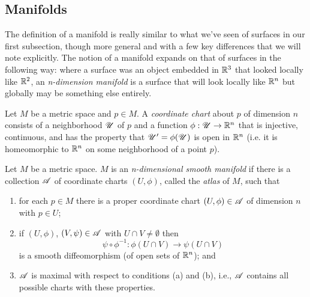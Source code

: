 \subsection{Manifolds}
  The definition of a manifold is really similar to what we've seen of surfaces in our first subsection, though more general and with a few key differences that we will note explicitly. The notion of a manifold expands on that of surfaces in the following way: where a surface was an object embedded in $\mathbb{R}^3$ that looked locally like $\mathbb{R}^2$, an \emph{n-dimension manifold} is a surface that will look locally like $\mathbb{R}^n$ but globally may be something else entirely.

  \begin{defn}
    Let $M$ be a metric space and $p \in M$. A \emph{coordinate chart} about $p$ of dimension $n$ consists of a neighborhood $\mathscr{U}$ of $p$ and a function $\phi: \mathscr{U} \to \mathbb{R}^n$ that is injective, continuous, and has the property that $\mathscr{U}^\prime = \phi(\mathscr{U})$ is open in $\mathbb{R}^n$ (i.e. it is homeomorphic to $\mathbb{R}^n$ on some neighborhood of a point $p$).
  \end{defn}


  \begin{defn}
    Let $M$ be a metric space. $M$ is an \emph{n-dimensional smooth manifold} if there is a collection $\mathscr{A}$ of coordinate charts $(U, \phi)$, called the \emph{atlas} of $M$, such that
    \begin{enumerate}
      \item for each $p \in M$ there is a proper coordinate chart $(U, \phi) \in \mathscr{A}$ of dimension $n$ with $p \in U$;

      \item if $(U, \phi)$, $(V, \psi) \in \mathscr{A}$ with $U \cap V \neq \emptyset$ then
      \[
        \psi \circ \phi^{-1}:\phi(U \cap V) \to \psi(U \cap V)
      \]
      is a smooth diffeomorphism (of open sets of $\mathbb{R}^n$); and

      \item $\mathscr{A}$ is maximal with respect to conditions (a) and (b), i.e., $\mathscr{A}$ contains all possible charts with these properties. 
    \end{enumerate}
  \end{defn}

